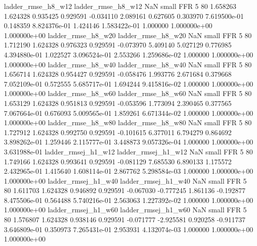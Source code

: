       ladder_rmse_h8_w12       ladder_rmse_h8_w12                   NaN      small      FFR                 5 80 1.658263       1.624328 0.935425       0.929591   -0.034110      2.089161      0.627605     0.303970   7.619500e-01  0.148359 8.824376e-01     1.424146   1.583422e-01            1.000000    1.000000e+00        1.000000e+00
      ladder_rmse_h8_w20       ladder_rmse_h8_w20                   NaN      small      FFR                 5 80 1.712190       1.624328 0.976323       0.929591   -0.073970      5.409140      5.027129     0.776985   4.394880e-01  1.022527 3.096524e-01     2.553266   1.259686e-02            1.000000    1.000000e+00        1.000000e+00
      ladder_rmse_h8_w40       ladder_rmse_h8_w40                   NaN      small      FFR                 5 80 1.656714       1.624328 0.954427       0.929591   -0.058476      1.993776      2.671684     0.379668   7.052109e-01  0.572555 5.685717e-01     1.694244   9.415816e-02            1.000000    1.000000e+00        1.000000e+00
      ladder_rmse_h8_w60       ladder_rmse_h8_w60                   NaN      small      FFR                 5 80 1.653129       1.624328 0.951813       0.929591   -0.053596      1.773094      2.390465     0.377565   7.067664e-01  0.676093 5.009565e-01     1.859261   6.671344e-02            1.000000    1.000000e+00        1.000000e+00
      ladder_rmse_h8_w80       ladder_rmse_h8_w80                   NaN      small      FFR                 5 80 1.727912       1.624328 0.992750       0.929591   -0.101615      6.377011      6.794279     0.864692   3.898262e-01  1.259446 2.115777e-01     3.448873   9.057326e-04            1.000000    1.000000e+00        3.631988e-01
     ladder_rmsej_h1_w12      ladder_rmsej_h1_w12                   NaN      small      FFR                 5 80 1.749166       1.624328 0.993641       0.929591   -0.081129      7.685530      6.890133     1.175572   2.432965e-01  1.415640 1.608114e-01     2.867762   5.298584e-03            1.000000    1.000000e+00        1.000000e+00
     ladder_rmsej_h1_w40      ladder_rmsej_h1_w40                   NaN      small      FFR                 5 80 1.611703       1.624328 0.946892       0.929591   -0.067030     -0.777245      1.861136    -0.192877   8.475506e-01  0.564488 5.740216e-01     2.563063   1.227392e-02            1.000000    1.000000e+00        1.000000e+00
     ladder_rmsej_h1_w60      ladder_rmsej_h1_w60                   NaN      small      FFR                 5 80 1.576807       1.624328 0.938146       0.929591   -0.071777     -2.925581      0.920258    -0.911737   3.646809e-01  0.350973 7.265431e-01     2.953931   4.132074e-03            1.000000    1.000000e+00        1.000000e+00

